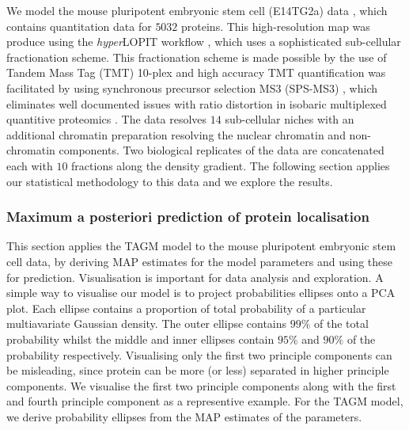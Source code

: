 \documentclass[12pt,english]{article}\usepackage[]{graphicx}\usepackage[]{color}
\begin{document}
We model the mouse pluripotent embryonic stem cell (E14TG2a) data  \citep{hyper}, which
contains quantitation data for $5032$ proteins. This high-resolution map was
produce using the \textit{hyper}LOPIT workflow \citep{Mulvey:2017}, which uses a sophisticated
sub-cellular fractionation scheme. This fractionation scheme is made possible
by the use of Tandem Mass Tag (TMT) 10-plex and high accuracy TMT quantification
was facilitated by using synchronous precursor selection MS3 (SPS-MS3) \citep{Mcalister::2014},
which eliminates well documented issues with ratio distortion in isobaric multiplexed quantitive proteomics
\citep{Ting:2011}. The data resolves
$14$ sub-cellular niches with an additional chromatin preparation
resolving the nuclear chromatin and non-chromatin components. Two
biological replicates of the data are concatenated each with $10$ fractions
along the density gradient. The following section applies our statistical
methodology to this data and we explore the results.

\subsubsection{Maximum a posteriori prediction of protein localisation}
This section applies the TAGM model to the mouse pluripotent embryonic
stem cell data, by deriving MAP estimates for the model parameters and
using these for prediction.  Visualisation is important for data
analysis and exploration. A simple way to visualise our model is to
project probabilities ellipses onto a PCA plot. Each ellipse contains
a proportion of total probability of a particular multiavariate
Gaussian density.  The outer ellipse contains $99\%$ of the total
probability whilst the middle and inner ellipses contain $95\%$ and
$90\%$ of the probability respectively. Visualising only the first two
principle components can be misleading, since protein can be more (or
less) separated in higher principle components.  We visualise the
first two principle components along with the first and fourth
principle component as a representive example. For the TAGM model, we
derive probability ellipses from the MAP estimates of the parameters.
\end{document}
